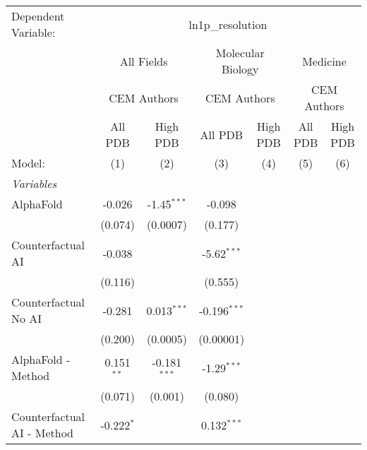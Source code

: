 \begingroup
\centering
\begin{tabular}{lcccccc}
   \tabularnewline \midrule \midrule
   Dependent Variable: & \multicolumn{6}{c}{ln1p\_resolution}\\
 & \multicolumn{2}{c}{All Fields} & \multicolumn{2}{c}{Molecular Biology} & \multicolumn{2}{c}{Medicine} \\
\cmidrule(lr){2-3} \cmidrule(lr){4-5} \cmidrule(lr){6-7}
 & \multicolumn{2}{c}{CEM Authors} & \multicolumn{2}{c}{CEM Authors} & \multicolumn{2}{c}{CEM Authors} \\
\cmidrule(lr){2-3} \cmidrule(lr){4-5} \cmidrule(lr){6-7}
 & \multicolumn{1}{c}{All PDB} & \multicolumn{1}{c}{High PDB} & \multicolumn{1}{c}{All PDB} & \multicolumn{1}{c}{High PDB} & \multicolumn{1}{c}{All PDB} & \multicolumn{1}{c}{High PDB} \\
\cmidrule(lr){2-2} \cmidrule(lr){3-3} \cmidrule(lr){4-4} \cmidrule(lr){5-5} \cmidrule(lr){6-6} \cmidrule(lr){7-7}
   Model:                                   & (1)          & (2)            & (3)            & (4) & (5) & (6)\\  
   \midrule
   \emph{Variables}\\
   AlphaFold                                & -0.026       & -1.45$^{***}$  & -0.098         &     &     &   \\   
                                            & (0.074)      & (0.0007)       & (0.177)        &     &     &   \\   
   Counterfactual AI                        & -0.038       &                & -5.62$^{***}$  &     &     &   \\   
                                            & (0.116)      &                & (0.555)        &     &     &   \\   
   Counterfactual No AI                     & -0.281       & 0.013$^{***}$  & -0.196$^{***}$ &     &     &   \\   
                                            & (0.200)      & (0.0005)       & (0.00001)      &     &     &   \\   
   AlphaFold - Method                       & 0.151$^{**}$ & -0.181$^{***}$ & -1.29$^{***}$  &     &     &   \\   
                                            & (0.071)      & (0.001)        & (0.080)        &     &     &   \\   
   Counterfactual AI - Method               & -0.222$^{*}$ &                & 0.132$^{***}$  &     &     &   \\   

\end{tabular}
